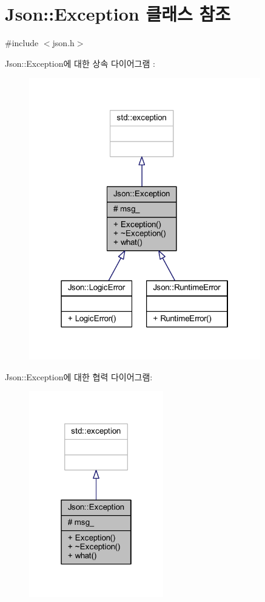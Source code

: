 \hypertarget{class_json_1_1_exception}{}\section{Json\+:\+:Exception 클래스 참조}
\label{class_json_1_1_exception}


{\ttfamily \#include $<$json.\+h$>$}



Json\+:\+:Exception에 대한 상속 다이어그램 \+: \nopagebreak
\begin{figure}[H]
\begin{center}
\leavevmode
\includegraphics[width=286pt]{class_json_1_1_exception__inherit__graph}
\end{center}
\end{figure}


Json\+:\+:Exception에 대한 협력 다이어그램\+:\nopagebreak
\begin{figure}[H]
\begin{center}
\leavevmode
\includegraphics[width=166pt]{class_json_1_1_exception__coll__graph}
\end{center}
\end{figure}
